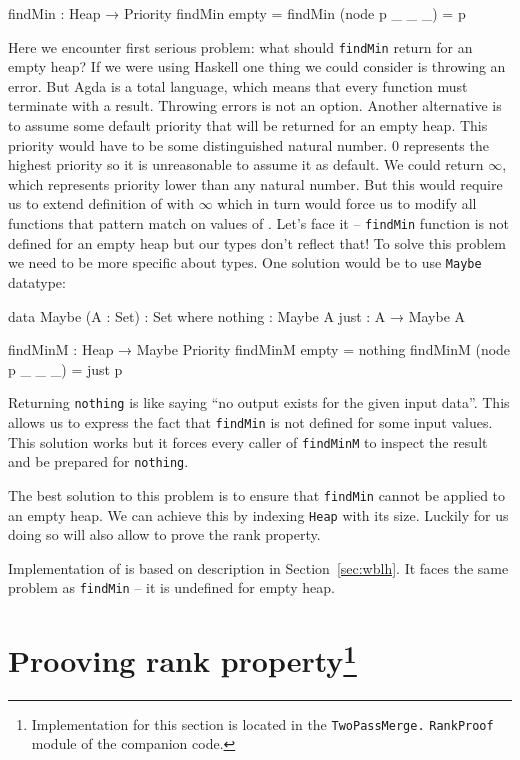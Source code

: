 \begin{code}
findMin : Heap → Priority
findMin empty          = 
findMin (node p _ _ _) = p
\end{code}
\noindent
Here we encounter first serious problem: what should \texttt{findMin} return for an empty heap? If we were using Haskell one thing we could consider is throwing an error. But Agda is a total language, which means that every function must terminate with a result. Throwing errors is not an option. Another alternative is to assume some default priority that will be returned for an empty heap. This priority would have to be some distinguished natural number. $0$ represents the highest priority so it is unreasonable to assume it as default. We could return $\infty$, which represents priority lower than any natural number. But this would require us to extend definition of \Nat with $\infty$ which in turn would force us to modify all functions that pattern match on values of \Nat. Let's face it -- \texttt{findMin} function is not defined for an empty heap but our types don't reflect that! To solve this problem we need to be more specific about types. One solution would be to use \texttt{Maybe} datatype:

\begin{code}
data Maybe (A : Set) : Set where
  nothing : Maybe A
  just    : A → Maybe A

findMinM : Heap → Maybe Priority
findMinM empty          = nothing
findMinM (node p _ _ _) = just p
\end{code}

\noindent
Returning \texttt{nothing} is like saying ``no output exists for the given input data''. This allows us to express the fact that \texttt{findMin} is not defined for some input values. This solution works but it forces every caller of \texttt{findMinM} to inspect the result and be prepared for \texttt{nothing}.

The best solution to this problem is to ensure that \texttt{findMin} cannot be applied to an empty heap. We can achieve this by indexing \texttt{Heap} with its size. Luckily for us doing so will also allow to prove the rank property.

Implementation of \deleteMin is based on description in Section~\ref{sec:wblh}. It faces the same problem as \texttt{findMin} -- it is undefined for empty heap.

\section[Prooving rank property]{Prooving rank property\footnote{Implementation for this section is located in the \texttt{TwoPassMerge.} \texttt{RankProof} module of the companion code.}}\label{sec:rank-property}

